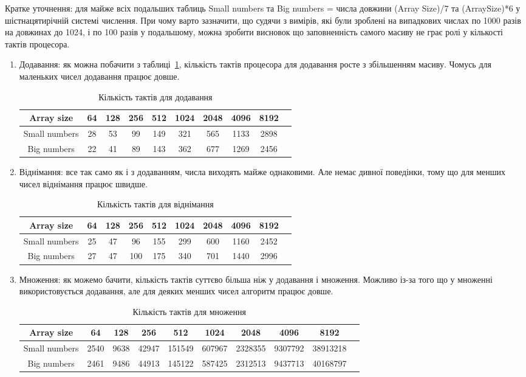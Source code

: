 \documentclass{article}
\begin{document}
Кратке уточнення: для майже всіх подальших таблиць Small numbers та Big numbers = числа довжини (Array Size)/7 та (ArraySize)*6 у шістнацятирічній системі числення. При чому варто зазначити, що судячи з вимірів, які були зроблені на випадкових числах по 1000 разів на довжинах до 1024, і по 100 разів у подальшому, можна зробити висновок що заповненність самого масиву не грає ролі у кількості тактів процесора.
\begin{enumerate}
    \item Додавання: як можна побачити з таблиці~\ref{tab:add}, кількість тактів процесора для додавання росте з збільшенням масиву. Чомусь для маленьких чисел додавання працює довше.
\begin{table}[ht!]
\centering
\begin{tabular}{|c|c|c|c|c|c|c|c|c|c|}
\hline
Array size& 64 & 128 & 256 & 512 & 1024 & 2048 & 4096 & 8192 \\\hline
Small numbers& 28 & 53 & 99 & 149 & 321 & 565 & 1133 & 2898 \\ 
Big numbers& 22 & 41 & 89 & 143 & 362 & 677 & 1269 & 2456 \\ \hline
\end{tabular}
\caption{\label{tab:add}Кількість тактів для додавання}
\end{table}
    \item Віднімання: все так само як і з додаванням, числа виходять майже однаковими. Але немає дивної поведінки, тому що для менших чисел віднімання працює швидше.
\begin{table}[ht!]
\centering
\begin{tabular}{|c|c|c|c|c|c|c|c|c|c|}
\hline
Array size& 64 & 128 & 256 & 512 & 1024 & 2048 & 4096 & 8192 \\\hline
Small numbers & 25 & 47 & 96 & 155 & 299 & 600 & 1160 & 2452 \\ 
Big numbers & 27 & 47 & 100 & 175 & 340 & 701 & 1440 & 2996 \\ \hline
\end{tabular}
\caption{\label{tab:sub}Кількість тактів для віднімання}
\end{table}



\item Множення: як можемо бачити, кількість тактів суттєво більша ніж у додавання і множення. Можливо із-за того що у множенні використовується додавання, але для деяких менших чисел алгоритм працює довше.

\begin{table}[ht!]
\centering
\begin{tabular}{|c|c|c|c|c|c|c|c|c|c|}
\hline
Array size& 64 & 128 & 256 & 512 & 1024 & 2048 & 4096 & 8192 \\\hline
Small numbers & 2540 & 9638 & 42947 & 151549 & 607967 & 2328355 & 9307792 & 38913218  \\ 
Big numbers & 2461 & 9486 & 44913 & 145122 & 587425 & 2312513 & 9437713 & 40168797  \\ \hline
\end{tabular}
\caption{\label{tab:mult}Кількість тактів для множення}
\end{table}


\end{enumerate}
\end{document}

